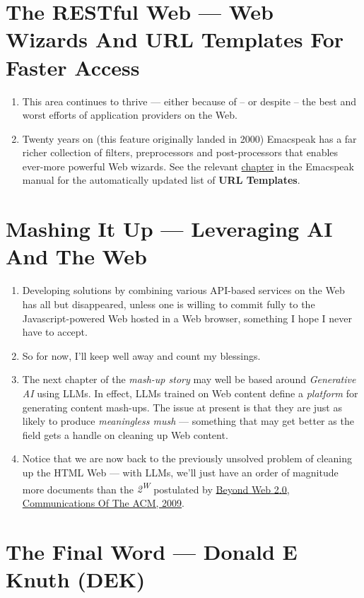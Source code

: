 \documentclass[11pt]{article}
\begin{document}
\section{The RESTful Web —  Web Wizards And URL Templates For Faster Access}
\label{sec:org9605012}

\begin{enumerate}
\item This area continues to thrive --- either because of -- or
despite -- the best and worst efforts of application providers on the
Web.
\item Twenty years on (this feature originally landed in 2000)
Emacspeak has a far richer collection of filters, preprocessors
and post-processors
 that enables ever-more powerful Web
wizards. See the relevant \href{https://tvraman.github.io/emacspeak/manual/URL-Templates.html}{chapter} in the Emacspeak manual for the
automatically updated list of \textbf{URL Templates}.
\end{enumerate}
\section{Mashing It Up —  Leveraging  AI And The Web}
\label{sec:orgf96301e}

\begin{enumerate}
\item Developing solutions by combining various API-based services on
the Web has all but disappeared, unless one is willing to commit
fully to the Javascript-powered Web hosted in a Web browser,
something I hope I never have to accept.
\item So for now, I'll keep
well away and count my blessings.
\item The next chapter of the \emph{mash-up story} may well be based around
 \emph{Generative AI} using LLMs. In effect, LLMs trained on   Web content 
define a \emph{platform} for generating content mash-ups.  The issue
at present is that they are just as  likely  to produce
\emph{meaningless mush} ---
something that may  get better as the field gets a
handle on cleaning up  Web content.
\item Notice that we are now back to the previously unsolved problem
of cleaning up the  HTML Web --- with LLMs, we'll just
have an order of magnitude more documents than the \emph{2\textsuperscript{W}} postulated
 by  \href{https://research.google/blog/beyond-web-20/?hl=in\&m=1}{Beyond Web 2.0, Communications
Of The ACM, 2009}.
\end{enumerate}
\section{The Final Word --- Donald E Knuth (DEK)}
\label{sec:org2cdd148}
\end{document}
